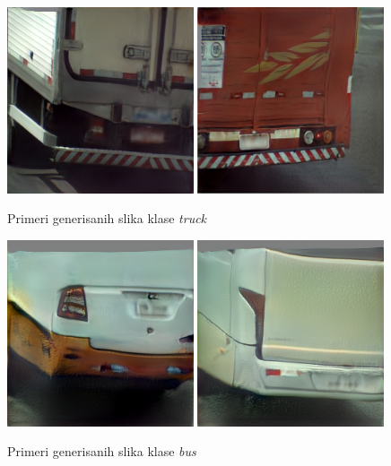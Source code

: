 \documentclass[12pt,oneside]{memoir}
\begin{document}
\begin{figure}[!htbp]
\centering
    \includegraphics[width=0.49\textwidth]{matfmaster/stylegan/truck/image0.png}
    \includegraphics[width=0.49\textwidth]{matfmaster/stylegan/truck/image6.png}
\caption{Primeri generisanih slika klase \textit{truck}}
\label{fig:section4_stylegan_truck_images}
\end{figure}


\begin{figure}[!htbp]
\centering
    \includegraphics[width=0.49\textwidth]{matfmaster/stylegan/bus/image0.png}  \includegraphics[width=0.49\textwidth]{matfmaster/stylegan/bus/image8.png} 
\caption{Primeri generisanih slika klase \textit{bus}}
\label{fig:section4_stylegan_bus_images}
\end{figure}
\end{document}
